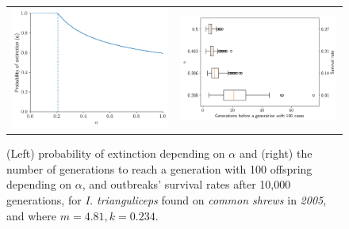 \documentclass[hidelinks]{article}
\begin{document}
\begin{figure}[]
	\begin{mdframed}[backgroundcolor=grey250,rightline=false,leftline=false,topline=false]
		\centering
		\begin{tabular}{ll}
			\includegraphics[width=.46\linewidth,valign=m]{extinctionProbability2005_I. trianguliceps_SA} & \includegraphics[width=.50\linewidth,valign=m]{firstGeneration100_2005_I. trianguliceps_SA}
		\end{tabular}
		\caption{(Left) probability of extinction depending on $ \alpha $ and (right) the number of generations to reach a generation with 100 offspring depending on $ \alpha $, and  outbreaks' survival rates after 10,000 generations, for \textit{I. trianguliceps} found on \textit{common shrews} in \textit{2005}, and where $ m = 4.81, k = 0.234 $.}
		\label{fig:simulation_2005_itrianguliceps_SA}
	\end{mdframed}
\end{figure}
\end{document}
